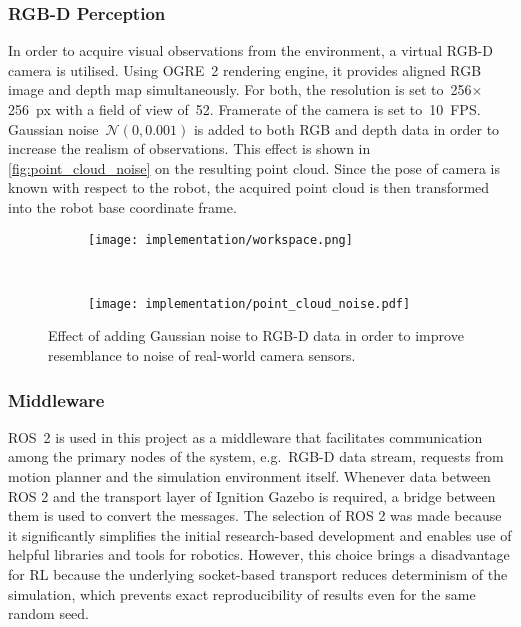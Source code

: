 \subsubsection{RGB-D Perception}

In order to acquire visual observations from the environment, a virtual RGB-D camera is utilised. Using OGRE~2 rendering engine, it provides aligned RGB image and depth map simultaneously. For both, the resolution is set to~256\({\times}\)256~px with a field of view of~52\textdegree. Framerate of the camera is set to~10~FPS. Gaussian noise~\(\mathcal{N}(0, 0.001)\) is added to both RGB and depth data in order to increase the realism of observations. This effect is shown in \autoref{fig:point_cloud_noise} on the resulting point cloud. Since the pose of camera is known with respect to the robot, the acquired point cloud is then transformed into the robot base coordinate frame.

\begin{figure}[ht]
    \centering
    \begin{subfigure}[ht]{0.325\textwidth}
        \begin{flushleft}%
            \texttt{[image: implementation/workspace.png]}
        \end{flushleft}%
    \end{subfigure}%
    ~\vrule~%
    \begin{subfigure}[ht]{0.65\textwidth}
        \begin{flushright}%
            \texttt{[image: implementation/point\_cloud\_noise.pdf]}
        \end{flushright}%
    \end{subfigure}%
    \caption{Effect of adding Gaussian noise to RGB-D data in order to improve resemblance to noise of real-world camera sensors.}
    \label{fig:point_cloud_noise}
\end{figure}


\subsubsection{Middleware}

ROS~2 is used in this project as a middleware that facilitates communication among the primary nodes of the system, e.g.~RGB-D data stream, requests from motion planner and the simulation environment itself. Whenever data between ROS 2 and the transport layer of Ignition Gazebo is required, a bridge between them is used to convert the messages. The selection of ROS 2 was made because it significantly simplifies the initial research-based development and enables use of helpful libraries and tools for robotics. However, this choice brings a disadvantage for RL because the underlying socket-based transport reduces determinism of the simulation, which prevents exact reproducibility of results even for the same random seed.


